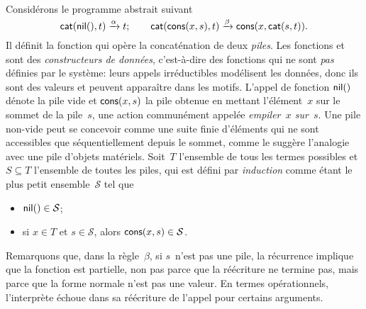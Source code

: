 Considérons le programme abstrait suivant
\begin{equation*}
\textsf{cat}(\textsf{nil}(),t)     \xrightarrow{\smash{\alpha}} t;\qquad
\textsf{cat}(\textsf{cons}(x,s),t) \xrightarrow{\smash{\beta}}
                                \textsf{cons}(x,\textsf{cat}(s,t)).
\end{equation*}
Il définit la fonction  qui opère
la concaténation  de deux \emph{piles}. Les
fonctions  et  sont des \emph{constructeurs de
  données},
c'est-à-dire des fonctions qui ne sont \emph{pas} définies par le
système: leurs appels irréductibles modélisent les données, donc ils
sont des valeurs et peuvent apparaître dans les motifs. L'appel de
fonction \(\textsf{nil}()\) dénote la pile vide et \(\textsf{cons}(x,s)\) la
pile obtenue en mettant l'élément~\(x\) sur le sommet de la
pile~\(s\), une action communément appelée \textsl{empiler~\(x\)
  sur~\(s\)}. Une pile non-vide peut se concevoir comme une suite
finie d'éléments qui ne sont accessibles que séquentiellement depuis
le sommet, comme le suggère l'analogie avec une pile d'objets
matériels. Soit~\(T\) l'ensemble de tous les termes possibles et \(S
\subseteq T\) l'ensemble de toutes les piles, qui est défini par
\emph{induction} comme étant le
plus petit ensemble~\(\mathcal{S}\) tel que
\begin{itemize}

  \item \(\textsf{nil}() \in \mathcal{S}\);\label{def:stack}

  \item si \(x \in T\) et \(s \in \mathcal{S}\), alors
    \(\textsf{cons}(x,s) \in \mathcal{S}\).

\end{itemize}

Remarquons que, dans la règle~\(\beta\), si \(s\)~n'est pas une pile,
la récurrence implique que la fonction  est partielle, non
pas parce que la réécriture ne termine pas, mais parce que la forme
normale n'est pas une
valeur. En termes opérationnels, l'interprète échoue dans sa
réécriture de l'appel pour certains arguments.

